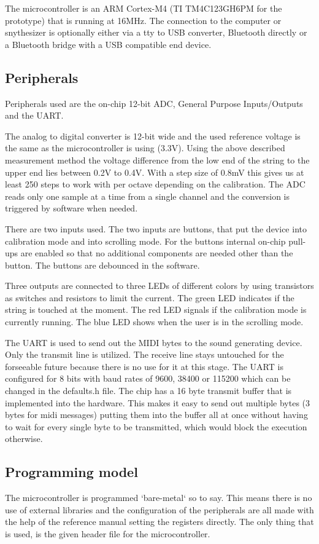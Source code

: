 \documentclass{article}
\begin{document}
The microcontroller is an ARM Cortex-M4 (TI TM4C123GH6PM for the prototype) that is running at 16MHz. The connection to the computer or snythesizer is optionally either via a tty to USB converter, Bluetooth directly or a Bluetooth bridge with a USB compatible end device.

\subsection{Peripherals}
Peripherals used are the on-chip 12-bit ADC, General Purpose Inputs/Outputs and the UART.

The analog to digital converter is 12-bit wide and the used reference voltage is the same as the microcontroller is using (3.3V). Using the above described measurement method the voltage difference from the low end of the string to the upper end lies between 0.2V to 0.4V. With a step size of 0.8mV this gives us at least 250 steps to work with per octave depending on the calibration. The ADC reads only one sample at a time from a single channel and the conversion is triggered by software when needed.

There are two inputs used. The two inputs are buttons, that put the device into calibration mode and into scrolling mode. For the buttons internal on-chip pull-ups are enabled so that no additional components are needed other than the button. The buttons are debounced in the software.

Three outputs are connected to three LEDs of different colors by using transistors as switches and resistors to limit the current. The green LED indicates if the string is touched at the moment. The red LED signals if the calibration mode is currently running. The blue LED shows when the user is in the scrolling mode.

The UART is used to send out the MIDI bytes to the sound generating device. Only the transmit line is utilized. The receive line stays untouched for the forseeable future because there is no use for it at this stage. The UART is configured for 8 bits with baud rates of 9600, 38400 or 115200 which can be changed in the defaults.h file. The chip has a 16 byte transmit buffer that is implemented into the hardware. This makes it easy to send out multiple bytes (3 bytes for midi messages) putting them into the buffer all at once without having to wait for every single byte to be transmitted, which would block the execution otherwise.

\subsection{Programming model}
The microcontroller is programmed `bare-metal` so to say. This means there is no use of external libraries and the configuration of the peripherals are all made with the help of the reference manual setting the registers directly. The only thing that is used, is the given header file for the microcontroller.
\end{document}
